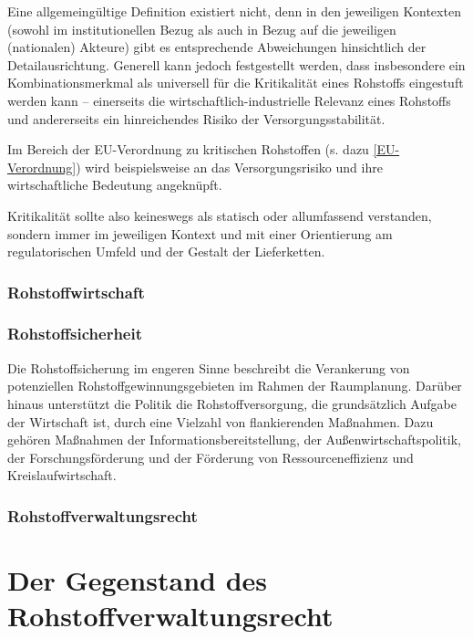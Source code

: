 \documentclass[12pt,a4paper,oneside]{book} %
\begin{document}
	Eine allgemeingültige Definition existiert nicht, denn in den jeweiligen Kontexten (sowohl im institutionellen Bezug als auch in Bezug auf die jeweiligen (nationalen) Akteure) gibt es entsprechende Abweichungen hinsichtlich der Detailausrichtung. Generell kann jedoch festgestellt werden, dass insbesondere ein Kombinationsmerkmal als universell für die Kritikalität eines Rohstoffs eingestuft werden kann -- einerseits die wirtschaftlich-industrielle Relevanz eines Rohstoffs und andererseits ein hinreichendes Risiko der Versorgungsstabilität.
	
	
	Im Bereich der EU-Verordnung zu kritischen Rohstoffen (s. dazu \ref{EU-Verordnung}) wird beispielsweise an das Versorgungsrisiko und ihre wirtschaftliche Bedeutung angeknüpft.
	
	Kritikalität sollte also keineswegs als statisch oder allumfassend verstanden, sondern immer im jeweiligen Kontext und mit einer Orientierung am regulatorischen Umfeld und der Gestalt der Lieferketten. 
	
	
	
	\subsection{Rohstoffwirtschaft}
	
	\subsection{Rohstoffsicherheit}
	
	\glqq Die Rohstoffsicherung im engeren Sinne beschreibt die Verankerung von potenziellen Rohstoffgewinnungsgebieten im Rahmen der Raumplanung. Darüber hinaus unterstützt die Politik die Rohstoffversorgung, die grundsätzlich Aufgabe der Wirtschaft ist, durch eine Vielzahl von flankierenden Maßnahmen. Dazu gehören Maßnahmen der Informationsbereitstellung, der Außenwirtschaftspolitik, der Forschungsförderung und der Förderung von Ressourceneffizienz und Kreislaufwirtschaft. \grqq \autocite{Bericht zur Rohstoffsituation in Deutschland 2023}
	
	\subsection{Rohstoffverwaltungsrecht}
	
	\chapter{Der Gegenstand des Rohstoffverwaltungsrecht}
	
\end{document}
